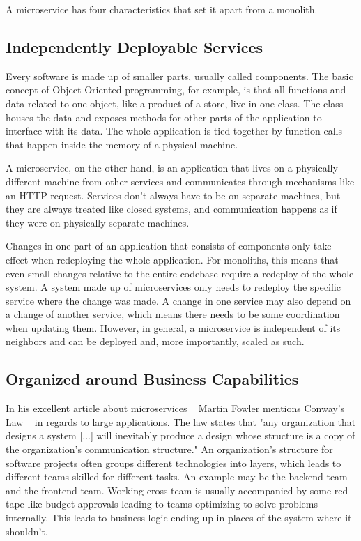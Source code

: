 A microservice has four characteristics that set it apart from a monolith.

\subsection{Independently Deployable Services}

Every software is made up of smaller parts, usually called components. The basic concept of Object-Oriented programming, for example, is that all functions and data related to one object, like a product of a store, live in one class. The class houses the data and exposes methods for other parts of the application to interface with its data. The whole application is tied together by function calls that happen inside the memory of a physical machine.

A microservice, on the other hand, is an application that lives on a physically different machine from other services and communicates through mechanisms like an HTTP request. Services don't always have to be on separate machines, but they are always treated like closed systems, and communication happens as if they were on physically separate machines.

Changes in one part of an application that consists of components only take effect when redeploying the whole application. For monoliths, this means that even small changes relative to the entire codebase require a redeploy of the whole system. A system made up of microservices only needs to redeploy the specific service where the change was made. A change in one service may also depend on a change of another service, which means there needs to be some coordination when updating them. However, in general, a microservice is independent of its neighbors and can be deployed and, more importantly, scaled as such.


\subsection{Organized around Business Capabilities}

In his excellent article about microservices ~\cite{microservices.2014} Martin Fowler mentions Conway's Law ~\cite{conway.1968} in regards to large applications. The law states that "any organization that designs a system [...] will inevitably produce a design whose structure is a copy of the organization's communication structure." An organization's structure for software projects often groups different technologies into layers, which leads to different teams skilled for different tasks. An example may be the backend team and the frontend team. Working cross team is usually accompanied by some red tape like budget approvals leading to teams optimizing to solve problems internally. This leads to business logic ending up in places of the system where it shouldn't.

